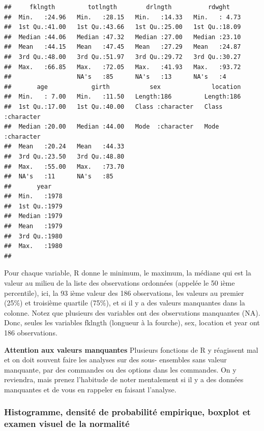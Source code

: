 \documentclass[12pt,]{book}
\makeatletter
\newenvironment{kframe}{%
\medskip{}
\setlength{\fboxsep}{.8em}
 \def\at@end@of@kframe{}%
 \ifinner\ifhmode%
  \def\at@end@of@kframe{\end{minipage}}%
  \begin{minipage}{\columnwidth}%
 \fi\fi%
 \def\FrameCommand##1{\hskip\@totalleftmargin \hskip-\fboxsep
 \colorbox{shadecolor}{##1}\hskip-\fboxsep
     \hskip-\linewidth \hskip-\@totalleftmargin \hskip\columnwidth}%
 \MakeFramed {\advance\hsize-\width
   \@totalleftmargin\z@ \linewidth\hsize
   \@setminipage}}%
 {\par\unskip\endMakeFramed%
 \at@end@of@kframe}
\newenvironment{rmdblock}[1]
  {
  \begin{itemize}
  \renewcommand{\labelitemi}{
    \raisebox{-.7\height}[0pt][0pt]{
      {\setkeys{Gin}{width=3em,keepaspectratio}\texttt{[image: images/\#1]}}
    }
  }
  \setlength{\fboxsep}{1em}
  \begin{kframe}
  \item
  }
  {
  \end{kframe}
  \end{itemize}
  }
\newenvironment{rmdwarning}
  {\begin{rmdblock}{warning}}
  {\end{rmdblock}}
\makeatother
\begin{document}
\begin{verbatim}
##     fklngth         totlngth        drlngth          rdwght     
##  Min.   :24.96   Min.   :28.15   Min.   :14.33   Min.   : 4.73  
##  1st Qu.:41.00   1st Qu.:43.66   1st Qu.:25.00   1st Qu.:18.09  
##  Median :44.06   Median :47.32   Median :27.00   Median :23.10  
##  Mean   :44.15   Mean   :47.45   Mean   :27.29   Mean   :24.87  
##  3rd Qu.:48.00   3rd Qu.:51.97   3rd Qu.:29.72   3rd Qu.:30.27  
##  Max.   :66.85   Max.   :72.05   Max.   :41.93   Max.   :93.72  
##                  NA's   :85      NA's   :13      NA's   :4      
##       age            girth           sex              location        
##  Min.   : 7.00   Min.   :11.50   Length:186         Length:186        
##  1st Qu.:17.00   1st Qu.:40.00   Class :character   Class :character  
##  Median :20.00   Median :44.00   Mode  :character   Mode  :character  
##  Mean   :20.24   Mean   :44.33                                        
##  3rd Qu.:23.50   3rd Qu.:48.80                                        
##  Max.   :55.00   Max.   :73.70                                        
##  NA's   :11      NA's   :85                                           
##       year     
##  Min.   :1978  
##  1st Qu.:1979  
##  Median :1979  
##  Mean   :1979  
##  3rd Qu.:1980  
##  Max.   :1980  
## 
\end{verbatim}

Pour chaque variable, R donne le minimum, le maximum, la médiane qui est la valeur au milieu de la liste des observations ordonnées (appelée le 50 ième percentile), ici, la 93 ième valeur des 186 observations, les valeurs au premier (25\%) et troisième quartile (75\%), et si il y a des valeurs manquantes dans la colonne.
Notez que plusieurs des variables ont des observations manquantes (NA).
Donc, seules les variables fklngth (longueur à la fourche), sex, location et year ont 186 observations.

\begin{rmdwarning}
\textbf{Attention aux valeurs manquantes}
Plusieurs fonctions de R y réagissent mal et on doit souvent faire les analyses sur des sous- ensembles sans valeur manquante, par des commandes ou des options dans les commandes.
On y reviendra, mais prenez l'habitude de noter mentalement si il y a des données manquantes et de vous en rappeler en faisant l'analyse.
\end{rmdwarning}

\hypertarget{histogramme-densituxe9-de-probabilituxe9-empirique-boxplot-et-examen-visuel-de-la-normalituxe9}{%
\subsubsection{Histogramme, densité de probabilité empirique, boxplot et examen visuel de la normalité}\label{histogramme-densituxe9-de-probabilituxe9-empirique-boxplot-et-examen-visuel-de-la-normalituxe9}}
\end{document}
